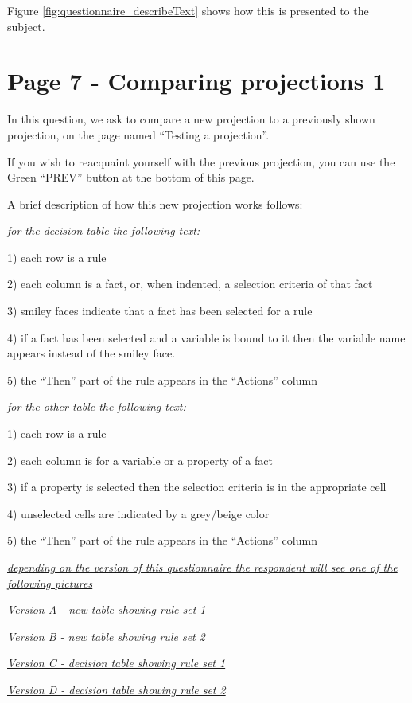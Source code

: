 Figure \ref{fig:questionnaire_describeText} shows how this is presented to the subject.

\section{Page 7 - Comparing projections 1}

In this question, we ask to compare a new projection to a previously shown projection, on the page named ``Testing a projection''.

If you wish to reacquaint yourself with the previous projection, you can use the Green ``PREV''  button at the bottom of this page.

A brief description of how this new projection works follows:

\emph{\underline{for the decision table the following text:}}

1) each row is a rule

2) each column is a fact, or, when indented, a selection criteria of that fact

3) smiley faces indicate that a fact has been selected for a rule

4) if a fact has been selected and a variable is bound to it then the variable name appears instead of the smiley face.

5) the ``Then'' part of the rule appears in the ``Actions'' column


\emph{\underline{for the other table the following text:}}

1) each row is a rule

2) each column is for a variable or a property of a fact

3) if a property is selected then the selection criteria is in the appropriate cell

4) unselected cells are indicated by a grey/beige color

5) the ``Then'' part of the rule appears in the ``Actions'' column

\emph{\underline{depending on the version of this questionnaire the respondent will see one of the following pictures}}

\emph{\underline{Version A - new table showing rule set 1}}

\emph{\underline{Version B - new table showing rule set 2}}

\emph{\underline{Version C - decision table showing rule set 1}}

\emph{\underline{Version D - decision table showing rule set 2}}

